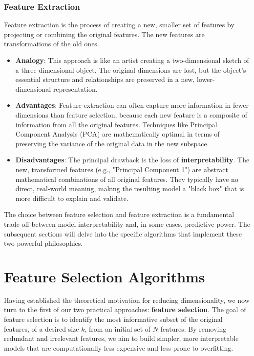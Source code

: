 \subsubsection{Feature Extraction}
Feature extraction is the process of creating a new, smaller set of features by projecting or combining the original features. The new features are transformations of the old ones.
\begin{itemize}
    \item \textbf{Analogy}: This approach is like an artist creating a two-dimensional sketch of a three-dimensional object. The original dimensions are lost, but the object's essential structure and relationships are preserved in a new, lower-dimensional representation.
    
    \item \textbf{Advantages}: Feature extraction can often capture more information in fewer dimensions than feature selection, because each new feature is a composite of information from all the original features. Techniques like Principal Component Analysis (PCA) are mathematically optimal in terms of preserving the variance of the original data in the new subspace.
    
    \item \textbf{Disadvantages}: The principal drawback is the loss of \textbf{interpretability}. The new, transformed features (e.g., "Principal Component 1") are abstract mathematical combinations of all original features. They typically have no direct, real-world meaning, making the resulting model a "black box" that is more difficult to explain and validate.
\end{itemize}
The choice between feature selection and feature extraction is a fundamental trade-off between model interpretability and, in some cases, predictive power. The subsequent sections will delve into the specific algorithms that implement these two powerful philosophies.

\section{Feature Selection Algorithms}
\label{sec:feature_selection}

Having established the theoretical motivation for reducing dimensionality, we now turn to the first of our two practical approaches: \textbf{feature selection}. The goal of feature selection is to identify the most informative subset of the original features, of a desired size $k$, from an initial set of $N$ features. By removing redundant and irrelevant features, we aim to build simpler, more interpretable models that are computationally less expensive and less prone to overfitting.

